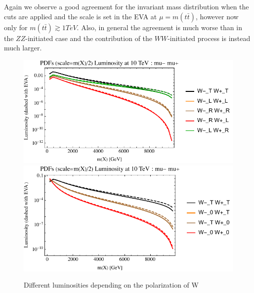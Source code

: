\documentclass[a4paper,11pt]{article}
\begin{document}
Again we observe a good agreement for the invariant mass distribution when the cuts are applied and the scale is set in the EVA at $\mu=m(t \bar t)$, however now only for $m(t \bar t) \gtrsim 1 TeV$. Also, in general the agreement is much worse than in the $ZZ$-initiated case and the contribution of the $WW$-initiated process is instead much larger. 



\begin{figure}[!t]
\includegraphics[width=0.46\linewidth]{Notebooks/PlotLumi/10TeV/lumis/plotWWpolRandL.pdf}
\includegraphics[width=0.46\linewidth]{Notebooks/PlotLumi/10TeV/lumis/plotWWpolTand0.pdf}
\caption{Different luminosities depending on the polarization of W \label{fig:lumiWWpol}}
\end{figure}
 
\end{document}
